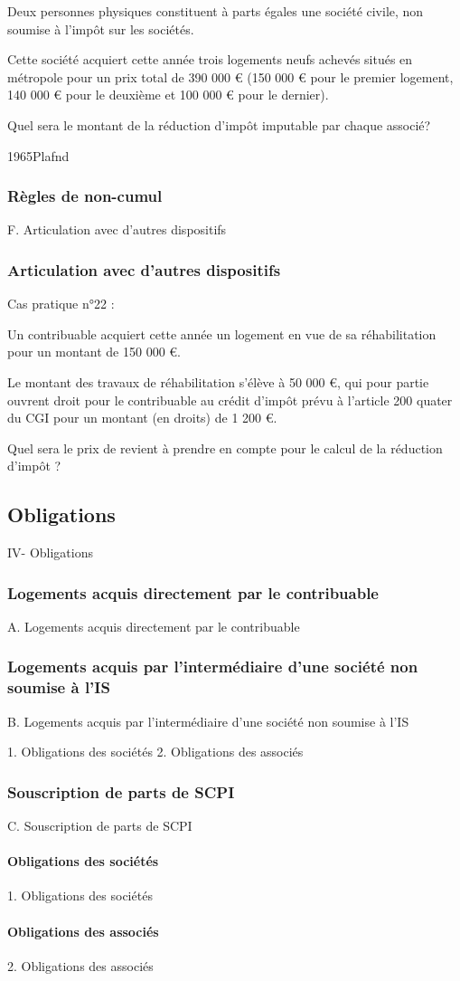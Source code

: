 				\begin{casPratique}{%
					Deux personnes physiques constituent à parts égales une société civile, non soumise à l'impôt sur les sociétés.

					Cette société acquiert cette année trois logements neufs achevés situés en métropole pour un prix total de 390 000 € (150 000 € pour le premier logement, 140 000 € pour le deuxième et 100 000 € pour le dernier).

					Quel sera le montant de la réduction d'impôt imputable par chaque associé?
					}
					1965Plafnd
				\end{casPratique}

			\subsubsection{Règles de non-cumul}


F. Articulation avec d'autres dispositifs
			\subsubsection{Articulation avec d'autres dispositifs}


			Cas pratique n°22 :

			Un contribuable acquiert cette année un logement en vue de sa réhabilitation pour un montant de 150 000 €.

			Le montant des travaux de réhabilitation s'élève à 50 000 €, qui pour partie ouvrent droit pour le contribuable au crédit d'impôt prévu à l'article 200 quater du CGI pour un montant (en droits) de 1 200 €.

			Quel sera le prix de revient à prendre en compte pour le calcul de la réduction d’impôt ?


	\subsection{Obligations}
IV- Obligations
		\subsubsection{Logements acquis directement par le contribuable}

A. Logements acquis directement par le contribuable

		\subsubsection{Logements acquis par l'intermédiaire d'une société non soumise à l'IS}
B. Logements acquis par l'intermédiaire d'une société non soumise à l'IS

1. Obligations des sociétés
2. Obligations des associés

		\subsubsection{Souscription de parts de SCPI}
C. Souscription de parts de SCPI

			\paragraph{Obligations des sociétés}
1. Obligations des sociétés

			\paragraph{Obligations des associés}

2. Obligations des associés
